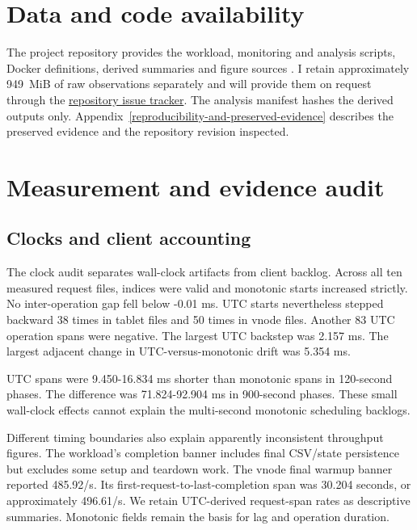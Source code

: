 \hypertarget{data-and-code-availability}{%
\section{Data and code
availability}\label{data-and-code-availability}}

The project repository provides the workload, monitoring and analysis scripts, Docker definitions, derived summaries and figure sources \cite{r35}. I retain approximately 949~MiB of raw observations separately and will provide them on request through the \href{https://github.com/GiorgiGogsadze/Scylla-Research/issues}{repository issue tracker}. The analysis manifest hashes the derived outputs only. Appendix~\ref{reproducibility-and-preserved-evidence} describes the preserved evidence and the repository revision inspected.

\newpage

\appendix

\hypertarget{measurement-and-evidence-audit}{%
\section{Measurement and evidence
audit}\label{measurement-and-evidence-audit}}

\hypertarget{clocks-and-client-accounting}{%
\subsection{Clocks and client
accounting}\label{clocks-and-client-accounting}}

The clock audit separates wall-clock artifacts from client backlog. Across all ten measured request files, indices were valid and monotonic starts increased strictly. No inter-operation gap fell below -0.01 ms. UTC starts nevertheless stepped backward 38 times in tablet files and 50 times in vnode files. Another 83 UTC operation spans were negative. The largest UTC backstep was 2.157 ms. The largest adjacent change in UTC-versus-monotonic drift was 5.354 ms.

UTC spans were 9.450-16.834 ms shorter than monotonic spans in 120-second phases. The difference was 71.824-92.904 ms in 900-second phases. These small wall-clock effects cannot explain the multi-second monotonic scheduling backlogs.

Different timing boundaries also explain apparently inconsistent throughput figures. The workload's completion banner includes final CSV/state persistence but excludes some setup and teardown work. The vnode final warmup banner reported 485.92/s. Its first-request-to-last-completion span was 30.204 seconds, or approximately 496.61/s. We retain UTC-derived request-span rates as descriptive summaries. Monotonic fields remain the basis for lag and operation duration.

